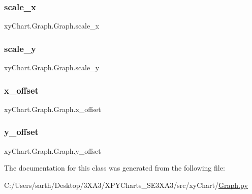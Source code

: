 \hypertarget{classxy_chart_1_1_graph_1_1_graph_a14290cdae8508d92d377b480874481e6}{}\label{classxy_chart_1_1_graph_1_1_graph_a14290cdae8508d92d377b480874481e6} 
\subsubsection{\texorpdfstring{scale\+\_\+x}{scale\_x}}
{\footnotesize\ttfamily xy\+Chart.\+Graph.\+Graph.\+scale\+\_\+x}

\hypertarget{classxy_chart_1_1_graph_1_1_graph_a4a09b7541a5bedb0eea71ac365d11660}{}\label{classxy_chart_1_1_graph_1_1_graph_a4a09b7541a5bedb0eea71ac365d11660} 
\subsubsection{\texorpdfstring{scale\+\_\+y}{scale\_y}}
{\footnotesize\ttfamily xy\+Chart.\+Graph.\+Graph.\+scale\+\_\+y}

\hypertarget{classxy_chart_1_1_graph_1_1_graph_a6a3fbe9a7cd5e8bb8b2bc48ea122173b}{}\label{classxy_chart_1_1_graph_1_1_graph_a6a3fbe9a7cd5e8bb8b2bc48ea122173b} 
\subsubsection{\texorpdfstring{x\+\_\+offset}{x\_offset}}
{\footnotesize\ttfamily xy\+Chart.\+Graph.\+Graph.\+x\+\_\+offset}

\hypertarget{classxy_chart_1_1_graph_1_1_graph_aa941de9b39790840703904995115f6b6}{}\label{classxy_chart_1_1_graph_1_1_graph_aa941de9b39790840703904995115f6b6} 
\subsubsection{\texorpdfstring{y\+\_\+offset}{y\_offset}}
{\footnotesize\ttfamily xy\+Chart.\+Graph.\+Graph.\+y\+\_\+offset}



The documentation for this class was generated from the following file\+:\begin{DoxyCompactItemize}
\item 
C\+:/\+Users/sarth/\+Desktop/3\+X\+A3/\+X\+P\+Y\+Charts\+\_\+\+S\+E3\+X\+A3/src/xy\+Chart/\hyperlink{_graph_8py}{Graph.\+py}\end{DoxyCompactItemize}
